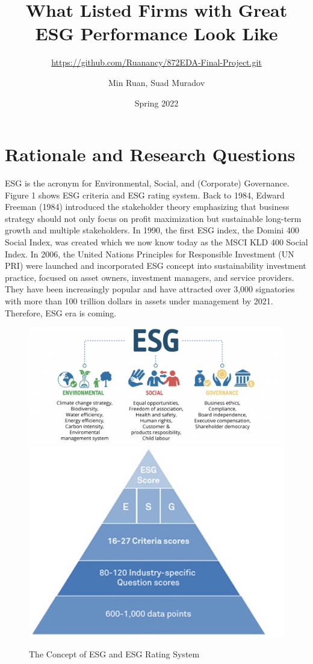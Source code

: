 \documentclass[
  12pt,
]{article}
\title{What Listed Firms with Great ESG Performance Look Like}
\subtitle{\url{https://github.com/Ruanancy/872EDA-Final-Project.git}}
\author{Min Ruan, Suad Muradov}
\date{Spring 2022}
\begin{document}
\maketitle

\newpage
\tableofcontents 
\newpage
\listoftables 
\newpage
\listoffigures 
\newpage

\hypertarget{rationale-and-research-questions}{%
\section{Rationale and Research
Questions}\label{rationale-and-research-questions}}

ESG is the acronym for Environmental, Social, and (Corporate)
Governance. Figure 1 shows ESG criteria and ESG rating system. Back to
1984, Edward Freeman (1984) introduced the stakeholder theory
emphasizing that business strategy should not only focus on profit
maximization but sustainable long-term growth and multiple stakeholders.
In 1990, the first ESG index, the Domini 400 Social Index, was created
which we now know today as the MSCI KLD 400 Social Index. In 2006, the
United Nations Principles for Responsible Investment (UN PRI) were
launched and incorporated ESG concept into sustainability investment
practice, focused on asset owners, investment managers, and service
providers. They have been increasingly popular and have attracted over
3,000 signatories with more than 100 trillion dollars in assets under
management by 2021. Therefore, ESG era is coming.

\begin{figure}

{\centering \includegraphics[width=0.6\linewidth]{./ESG} \includegraphics[width=0.35\linewidth]{./ESG Rating System} 

}

\caption{The Concept of ESG and ESG Rating System}\label{fig:ESG}
\end{figure}
\end{document}
